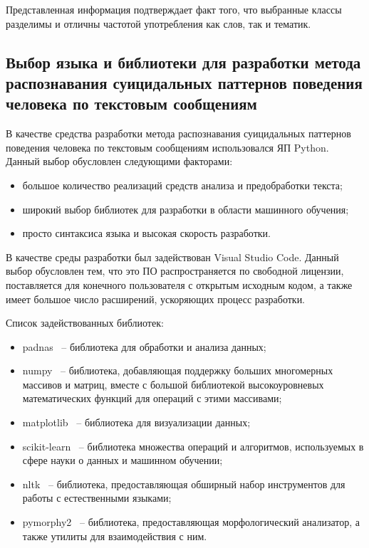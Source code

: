 Представленная информация подтверждает факт того, что выбранные классы разделимы и отличны частотой употребления как слов, так и тематик.

\subsection{Выбор языка и библиотеки для разработки метода распознавания суицидальных паттернов поведения человека по текстовым сообщениям}

В качестве средства разработки метода распознавания суицидальных паттернов поведения человека по текстовым сообщениям использовался ЯП Python. Данный выбор обусловлен следующими факторами:

\begin{itemize}
	\item большое количество реализаций средств анализа и предобработки текста;
	\item широкий выбор библиотек для разработки в области машинного обучения;
	\item просто синтаксиса языка и высокая скорость разработки.
\end{itemize}

В качестве среды разработки был задействован Visual Studio Code. Данный выбор обусловлен тем, что это ПО распространяется по свободной лицензии, поставляется для конечного пользователя с открытым исходным кодом, а также имеет большое число расширений, ускоряющих процесс разработки.

Список задействованных библиотек:
\begin{itemize}
	\item padnas~\cite{pandas} -- библиотека для обработки и анализа данных;
	\item numpy~\cite{numpy} -- библиотека, добавляющая поддержку больших многомерных массивов и матриц, вместе с большой библиотекой высокоуровневых математических функций для операций с этими массивами;
	\item matplotlib~\cite{matplotlib} -- библиотека для визуализации данных;
	\item scikit-learn~\cite{sklearn} -- библиотека множества операций и алгоритмов, используемых в сфере науки о данных и машинном обучении;
	\item nltk~\cite{nltk} -- библиотека, предоставляющая обширный набор инструментов для работы с естественными языками;
	\item pymorphy2~\cite{pymorphy} -- библиотека, предоставляющая морфологический анализатор, а также утилиты для взаимодействия с ним.
\end{itemize}

